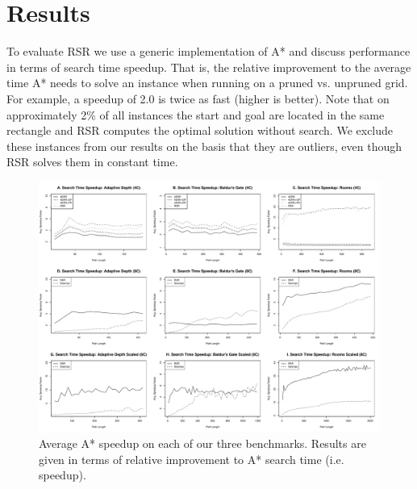 \section{Results}
\label{sec-results}
To evaluate RSR we use a generic implementation of A* and discuss performance 
in terms of search time speedup. That is, the relative improvement to the average 
time A* needs to solve an instance when running on a pruned  vs. unpruned grid.
For example, a speedup of 2.0 is twice as fast (higher is better).
%
Note that on approximately 2\% of all instances the start and goal are located
in the same rectangle and RSR computes the optimal solution without
search.  We exclude these instances from our results on the basis that they are 
outliers, even though RSR solves them in constant time.

\par 
\begin{figure}[t]
       \begin{center}
                       \includegraphics[width=0.97\columnwidth, trim = 10mm 10mm 10mm 0mm]{diagrams/speedup.pdf}
       \end{center}
       \caption{Average A* speedup on each of our three benchmarks. 
		Results are given in terms of relative improvement to A* search time (i.e. speedup).}
\label{fig-speedup}
\end{figure}


